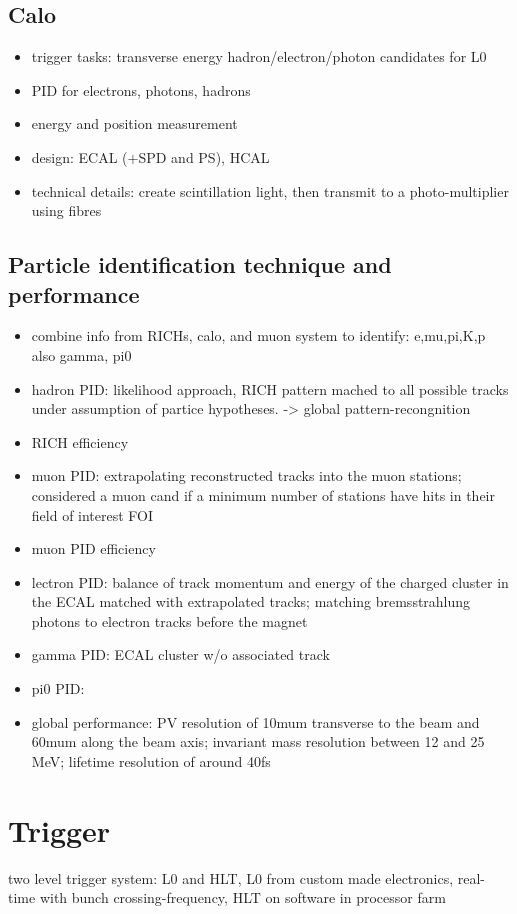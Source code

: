 \subsection{Calo}
\begin{itemize}
  \item trigger tasks: transverse energy hadron/electron/photon candidates for L0
  \item PID for electrons, photons, hadrons
  \item energy and position measurement
  \item design: ECAL (+SPD and PS), HCAL
  \item technical details: create scintillation light, then transmit to a photo-multiplier using fibres
\end{itemize}
\subsection{Particle identification technique and performance}
\begin{itemize}
  \item combine info from RICHs, calo, and muon system to identify: e,mu,pi,K,p also gamma, pi0
  \item hadron PID: likelihood approach, RICH pattern mached to all possible tracks under assumption of partice hypotheses. -> global pattern-recongnition
  \item RICH efficiency
  \item muon PID: extrapolating reconstructed tracks into the muon stations; considered a muon cand if a minimum number of stations have hits in their field of interest FOI
  \item muon PID efficiency
  \item lectron PID: balance of track momentum and energy of the charged cluster in the ECAL matched with extrapolated tracks; matching bremsstrahlung photons to electron tracks before the magnet
  \item gamma PID: ECAL cluster w/o associated track
  \item pi0 PID: 
  \item global performance: PV resolution of 10mum transverse to the beam and 60mum along the beam axis; invariant mass resolution between 12 and 25 MeV; lifetime resolution of around 40fs
\end{itemize}

\section{Trigger}
two level trigger system: L0 and HLT, L0 from custom made electronics, real-time with bunch crossing-frequency, HLT on software in processor farm
